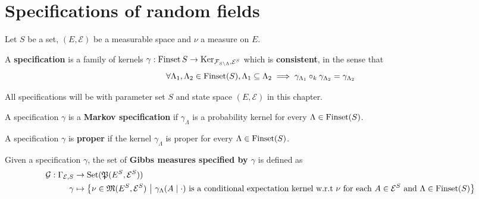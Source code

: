 \chapter{Specifications of random fields}

Let $S$ be a set, $(E, \mathcal{E})$ be a measurable space and $\nu$ a measure on $E$.

\begin{definition}[Specification]
    \label{def:specification}
    \leanok

    A {\bf specification} is a family of kernels $\gamma : \operatorname{Finset} S \to \operatorname{Ker}_{\mathcal{F}_{S\setminus\Lambda}, \mathcal{E}^S}$ which is {\bf consistent}, in the sense that
    $$\forall \Lambda_1, \Lambda_2 \in \operatorname{Finset}(S), \Lambda_1 \subseteq \Lambda_2 \implies \gamma_{\Lambda_1} \circ_k \gamma_{\Lambda_2} = \gamma_{\Lambda_2}$$
\end{definition}

All specifications will be with parameter set $S$ and state space $(E, \mathcal{E})$ in this chapter.

\begin{definition}
    \label{def:markov-specification}
    \leanok

    A specification $\gamma$ is a \textbf{Markov specification} if $\gamma_\Lambda$ is a probability kernel for every $\Lambda \in \operatorname{Finset}(S)$.
\end{definition}

\begin{definition}
    \label{def:proper-specification}
    \leanok

    A specification $\gamma$ is \textbf{proper} if the kernel $\gamma_\Lambda$ is proper for every $\Lambda \in \operatorname{Finset}(S)$.
\end{definition}

\begin{definition}
    \label{def:gibbs-measure}
    \leanok
    Given a specification $\gamma$, the set of \textbf{Gibbs measures specified by $\gamma$} is defined as
    \begin{align}
        \mathcal{G}:\Gamma_{\mathcal{E}, S}&\to\text{Set}(\mathfrak{P}(E^S, \mathcal{E}^S))\\
        \gamma&\mapsto\left\{\nu\in\mathfrak{M}(E^S, \mathcal{E}^S)~\middle\vert~\gamma_\Lambda(A\mid\cdot)~\text{is a conditional expectation kernel w.r.t }\nu\text{ for each } A\in\mathcal{E}^S\text{ and }\Lambda\in\operatorname{Finset}(S)\right\}
    \end{align}
\end{definition}


